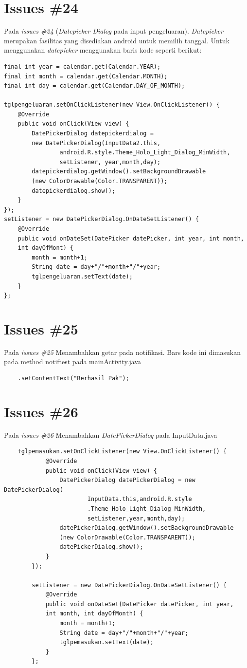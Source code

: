 \section{Issues \#24}
Pada \textit{issues \#24} (\textit{Datepicker Dialog} pada input pengeluaran). \textit{Datepicker} merupakan fasilitas yang disediakan android untuk memilih tanggal. Untuk menggunakan \textit{datepicker} menggunakan baris kode seperti berikut:
\begin{verbatim}
final int year = calendar.get(Calendar.YEAR);
final int month = calendar.get(Calendar.MONTH);
final int day = calendar.get(Calendar.DAY_OF_MONTH);

tglpengeluaran.setOnClickListener(new View.OnClickListener() {
    @Override
    public void onClick(View view) {
        DatePickerDialog datepickerdialog = 
        new DatePickerDialog(InputData2.this,
                android.R.style.Theme_Holo_Light_Dialog_MinWidth,
                setListener, year,month,day);
        datepickerdialog.getWindow().setBackgroundDrawable
        (new ColorDrawable(Color.TRANSPARENT));
        datepickerdialog.show();
    }
});
setListener = new DatePickerDialog.OnDateSetListener() {
    @Override
    public void onDateSet(DatePicker datePicker, int year, int month, 
    int dayOfMont) {
        month = month+1;
        String date = day+"/"+month+"/"+year;
        tglpengeluaran.setText(date);
    }
};
\end{verbatim}


\section{Issues \#25}
Pada \textit{issues \#25} Menambahkan getar pada notifikasi. Bars kode ini dimasukan pada method notiftest pada mainActivity.java
\begin{verbatim}
    .setContentText("Berhasil Pak");
\end{verbatim}

\section{Issues \#26}
Pada \textit{issues \#26} Menambahkan \textit{DatePickerDialog} pada InputData.java
\begin{verbatim}
    tglpemasukan.setOnClickListener(new View.OnClickListener() {
            @Override
            public void onClick(View view) {
                DatePickerDialog datePickerDialog = new DatePickerDialog(
                        InputData.this,android.R.style
                        .Theme_Holo_Light_Dialog_MinWidth,
                        setListener,year,month,day);
                datePickerDialog.getWindow().setBackgroundDrawable
                (new ColorDrawable(Color.TRANSPARENT));
                datePickerDialog.show();
            }
        });

        setListener = new DatePickerDialog.OnDateSetListener() {
            @Override
            public void onDateSet(DatePicker datePicker, int year,
            int month, int dayOfMonth) {
                month = month+1;
                String date = day+"/"+month+"/"+year;
                tglpemasukan.setText(date);
            }
        };
\end{verbatim}


